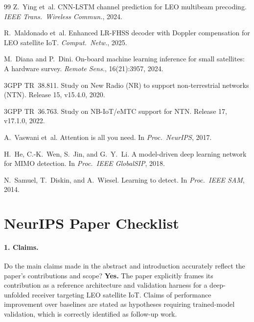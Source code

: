 \documentclass{article}
\begin{document}
{\begin{thebibliography}{99}
Z.~Ying et~al.
\newblock CNN-LSTM channel prediction for LEO multibeam precoding.
\newblock \emph{IEEE Trans.\ Wireless Commun.}, 2024.

R.~Maldonado et~al.
\newblock Enhanced LR-FHSS decoder with Doppler compensation for LEO satellite IoT.
\newblock \emph{Comput.\ Netw.}, 2025.

M.~Diana and P.~Dini.
\newblock On-board machine learning inference for small satellites: A hardware survey.
\newblock \emph{Remote Sens.}, 16(21):3957, 2024.

3GPP TR~38.811.
\newblock Study on New Radio (NR) to support non-terrestrial networks (NTN).
\newblock Release 15, v15.4.0, 2020.

3GPP TR~36.763.
\newblock Study on NB-IoT/eMTC support for NTN.
\newblock Release 17, v17.1.0, 2022.

A.~Vaswani et~al.
\newblock Attention is all you need.
\newblock In \emph{Proc.\ NeurIPS}, 2017.

H.~He, C.-K.~Wen, S.~Jin, and G.~Y.~Li.
\newblock A model-driven deep learning network for MIMO detection.
\newblock In \emph{Proc.\ IEEE GlobalSIP}, 2018.

N.~Samuel, T.~Diskin, and A.~Wiesel.
\newblock Learning to detect.
\newblock In \emph{Proc.\ IEEE SAM}, 2014.

\end{thebibliography}
}

\appendix
\section{NeurIPS Paper Checklist}

\paragraph{1. Claims.}
Do the main claims made in the abstract and introduction accurately reflect the paper's contributions and scope?
\textbf{Yes.} The paper explicitly frames its contribution as a reference architecture and validation harness for a deep-unfolded receiver targeting LEO satellite IoT. Claims of performance improvement over baselines are stated as hypotheses requiring trained-model validation, which is correctly identified as follow-up work.
\end{document}
